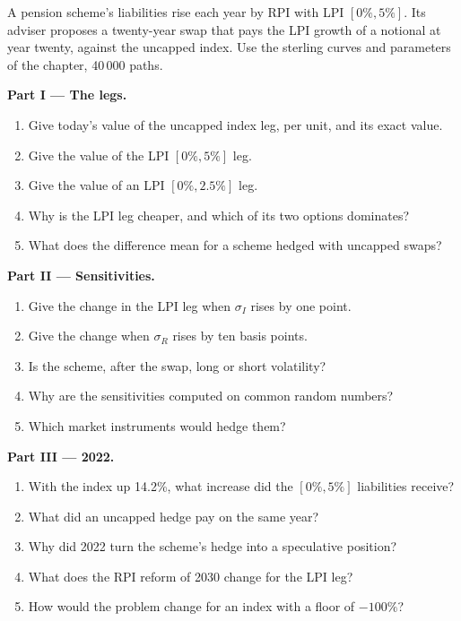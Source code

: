 \begin{problem}\label{pb:rc:inflation-derivatives:1}
A pension scheme's liabilities rise each year by RPI with LPI $[0\%,5\%]$. Its adviser
proposes a twenty-year swap that pays the LPI growth of a notional at year twenty, against
the uncapped index. Use the sterling curves and parameters of the chapter, 40\,000 paths.

\medskip\noindent\textbf{Part I --- The legs.}
\begin{enumerate}
\item Give today's value of the uncapped index leg, per unit, and its exact value.
\item Give the value of the LPI $[0\%,5\%]$ leg.
\item Give the value of an LPI $[0\%,2.5\%]$ leg.
\item Why is the LPI leg cheaper, and which of its two options dominates?
\item What does the difference mean for a scheme hedged with uncapped swaps?
\end{enumerate}

\medskip\noindent\textbf{Part II --- Sensitivities.}
\begin{enumerate}[resume]
\item Give the change in the LPI leg when $\sigma_I$ rises by one point.
\item Give the change when $\sigma_R$ rises by ten basis points.
\item Is the scheme, after the swap, long or short volatility?
\item Why are the sensitivities computed on common random numbers?
\item Which market instruments would hedge them?
\end{enumerate}

\medskip\noindent\textbf{Part III --- 2022.}
\begin{enumerate}[resume]
\item With the index up 14.2\%, what increase did the $[0\%,5\%]$ liabilities receive?
\item What did an uncapped hedge pay on the same year?
\item Why did 2022 turn the scheme's hedge into a speculative position?
\item What does the RPI reform of 2030 change for the LPI leg?
\item How would the problem change for an index with a floor of $-100\%$?
\end{enumerate}


\end{problem}

